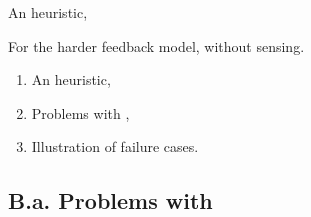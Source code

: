 \documentclass[12pt,english,ignorenonframetext,aspectratio=169,]{beamer}
\providecommand{\tightlist}{%
  \setlength{\itemsep}{0pt}\setlength{\parskip}{0pt}}
\begin{document}
\begin{frame}{An heuristic, \Selfish}

For the harder feedback model, without sensing.

\begin{enumerate}
\def\labelenumi{\arabic{enumi}.}
\tightlist
\item
  An heuristic,\vspace*{15pt}
\item
  Problems with \Selfish,\vspace*{15pt}
\item
  Illustration of failure cases.
\end{enumerate}

\end{frame}



\subsection{\hfill{}B.a. Problems with \Selfish\hfill{}}
\end{document}
